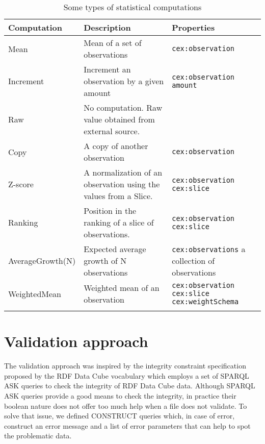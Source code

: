 \begin{table*}[htb]
\caption{Some types of statistical computations}
\label{table:computations}
\begin{center}
\begin{tabular}{ p{} p{} p{}}
\toprule
Computation & Description & Properties \\
\hline
Mean	    & Mean of a set of observations 
			& \lstinline|cex:observation| \\
Increment	& Increment an observation by a given amount 
			& \lstinline|cex:observation| \lstinline|amount|  \\
Raw			& No computation. Raw value obtained from external source.
			&  \\
Copy		& A copy of another observation 
			& \lstinline|cex:observation| \\
Z-score		& A normalization of an observation using the values from a Slice. 
			& \lstinline|cex:observation| \lstinline|cex:slice| \\
Ranking		& Position in the ranking of a slice of observations. 
			& \lstinline|cex:observation| \lstinline|cex:slice| \\
AverageGrowth(N)	& Expected average growth of N observations
			& \lstinline|cex:observations| a collection of observations \\
WeightedMean & Weighted mean of an observation
			& \lstinline|cex:observation| 
			  \lstinline|cex:slice|
			  \lstinline|cex:weightSchema| \\
\bottomrule\\
\end{tabular}
\end{center}
\end{table*}

\section{Validation approach}

The validation approach was inspired by the integrity constraint specification
 proposed by the RDF Data Cube vocabulary which employs a set of SPARQL ASK queries
 to check the integrity of RDF Data Cube data. 
 Although SPARQL ASK queries provide a good means to check the integrity, in practice
  their boolean nature does not offer too much help when a file does not validate.
 To solve that issue, we defined CONSTRUCT queries which, in case of error, 
  construct an error message and a list of error parameters that can help to spot the
  problematic data.

